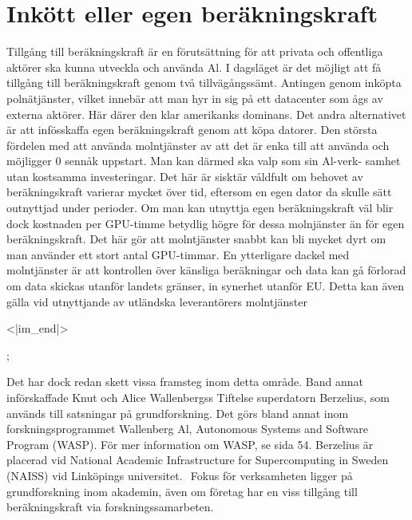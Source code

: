 {{\section*{Inkött eller egen beräkningskraft}
Tillgång till beräkningskraft är en förutsättning för att privata och offentliga aktörer ska kunna utveckla och använda Al. I dagsläget är det möjligt att få tillgång till beräkningskraft genom två tillvägångssämt. Antingen genom inköpta polnätjänster, vilket innebär att man hyr in sig på ett datacenter som ågs av externa aktörer. Här därer den klar amerikanks dominans. Det andra alternativet är att infösskaffa egen beräkningskraft genom att köpa datorer.
Den största fördelen med att använda molntjänster av att det är enka till att använda och möjligger 0 sennåk uppstart. Man kan därmed ska valp som sin Al-verk- samhet utan kostsamma investeringar. Det här är sisktär våldfult om behovet av beräkningskraft varierar mycket över tid, eftersom en egen dator da skulle sätt outnyttjad under perioder. Om man kan utnyttja egen beräkningskraft väl blir dock kostnaden per GPU-timme betydlig högre för dessa molnjänster än för egen beräkningskraft.
Det här gör att molntjänster snabbt kan bli mycket dyrt om man använder ett stort antal GPU-timmar.
En ytterligare dackel med molntjänster är att kontrollen över känsliga beräkningar och data kan gå förlorad om data skickas utanför landets gränser, in synerhet utanför EU. Detta kan även gälla vid utnyttjande av utländska leverantörers molntjänster

<|im_end|>};

Det har dock redan skett vissa framsteg inom detta område. Band annat införskaffade Knut och Alice Wallenbergss Tiftelse superdatorn Berzelius, som används till satsningar på grundforskning. Det görs bland annat inom forskningsprogrammet Wallenberg Al, Autonomous Systems and Software Program (WASP). För mer information om WASP, se sida 54.
Berzelius är placerad vid National Academic Infrastructure for Supercomputing in Sweden (NAISS) vid Linköpings universitet. \({ }^{}\) Fokus för verksamheten ligger på grundforskning inom akademin, även om företag har en viss tillgång till beräkningskraft via forskningssamarbeten.
}
